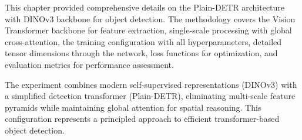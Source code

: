 \documentclass[12pt,a4paper]{article}
\begin{document}
This chapter provided comprehensive details on the Plain-DETR architecture with DINOv3 backbone for object detection. The methodology covers the Vision Transformer backbone for feature extraction, single-scale processing with global cross-attention, the training configuration with all hyperparameters, detailed tensor dimensions through the network, loss functions for optimization, and evaluation metrics for performance assessment.

The experiment combines modern self-supervised representations (DINOv3) with a simplified detection transformer (Plain-DETR), eliminating multi-scale feature pyramids while maintaining global attention for spatial reasoning. This configuration represents a principled approach to efficient transformer-based object detection.



\end{document}
